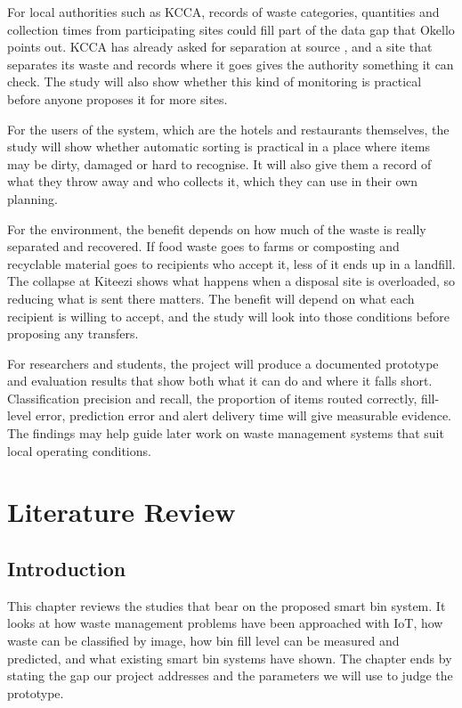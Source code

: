 \documentclass[12pt,a4paper]{report}
\begin{document}
For local authorities such as KCCA, records of waste categories, quantities and collection times from participating sites could fill part of the data gap that Okello \cite{okello} points out. KCCA has already asked for separation at source \cite{kccand}, and a site that separates its waste and records where it goes gives the authority something it can check. The study will also show whether this kind of monitoring is practical before anyone proposes it for more sites.

For the users of the system, which are the hotels and restaurants themselves, the study will show whether automatic sorting is practical in a place where items may be dirty, damaged or hard to recognise. It will also give them a record of what they throw away and who collects it, which they can use in their own planning.

For the environment, the benefit depends on how much of the waste is really separated and recovered. If food waste goes to farms or composting and recyclable material goes to recipients who accept it, less of it ends up in a landfill. The collapse at Kiteezi shows what happens when a disposal site is overloaded, so reducing what is sent there matters. The benefit will depend on what each recipient is willing to accept, and the study will look into those conditions before proposing any transfers.

For researchers and students, the project will produce a documented prototype and evaluation results that show both what it can do and where it falls short. Classification precision and recall, the proportion of items routed correctly, fill-level error, prediction error and alert delivery time will give measurable evidence. The findings may help guide later work on waste management systems that suit local operating conditions.

\chapter{Literature Review}

\section{Introduction}

This chapter reviews the studies that bear on the proposed smart bin system. It looks at how waste management problems have been approached with IoT, how waste can be classified by image, how bin fill level can be measured and predicted, and what existing smart bin systems have shown. The chapter ends by stating the gap our project addresses and the parameters we will use to judge the prototype.
\end{document}
